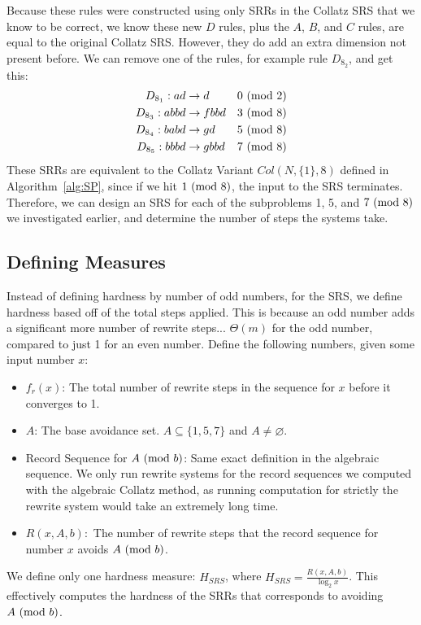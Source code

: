 Because these rules were constructed using only SRRs in the Collatz SRS that we know to be correct, we know these new $D$ rules, plus the $A$, $B$, and $C$ rules, are equal to the original Collatz SRS. However, they do add an extra dimension not present before. We can remove one of the rules, for example rule $D_{8_2}$, and get this:
\begin{align*}
    D_{8_1}: ad &\rightarrow d &\text{$0\ (\mathrm{mod}\ 2)$}\\
    D_{8_3}: abbd &\rightarrow fbbd &\text{$3\ (\mathrm{mod}\ 8)$}\\
    D_{8_4}: babd &\rightarrow gd &\text{$5\ (\mathrm{mod}\ 8)$}\\
    D_{8_5}: bbbd &\rightarrow gbbd &\text{$7\ (\mathrm{mod}\ 8)$}
\end{align*}
These SRRs are equivalent to the Collatz Variant $Col(N,\{1\},8)$ defined in Algorithm~\ref{alg:SP}, since if we hit $1 \ (\mathrm{mod}\ 8)$, the input to the SRS terminates. Therefore, we can design an SRS for each of the subproblems 1, 5, and $7 \ (\mathrm{mod}\ 8)$ we investigated earlier, and determine the number of steps the systems take.

\subsection{Defining Measures} \label{subsec:rewritemeasuredefs}
Instead of defining hardness by number of odd numbers, for the SRS, we define hardness based off of the total steps applied. This is because an odd number adds a significant more number of rewrite steps... $\Theta(m)$ for the odd number, compared to just 1 for an even number. Define the following numbers, given some input number $x$:
\begin{itemize}
    \item $f_r(x)$: The total number of rewrite steps in the sequence for $x$ before it converges to 1.
    \item $A$: The base avoidance set. $A \subseteq \{1, 5, 7\}$ and $A \ne \varnothing$.
    \item Record Sequence for $A \ (\mathrm{mod}\ b)$: Same exact definition in the algebraic sequence. We only run rewrite systems for the record sequences we computed with the algebraic Collatz method, as running computation for strictly the rewrite system would take an extremely long time.
    \item $R(x, A, b):$ The number of rewrite steps that the record sequence for number $x$ avoids $A \ (\mathrm{mod}\ b)$. 
\end{itemize}
We define only one hardness measure: $H_{SRS}$, where $H_{SRS} = \frac{R(x, A, b)}{\log_2{x}}$. This effectively computes the hardness of the SRRs that corresponds to avoiding $A \ (\mathrm{mod}\ b)$.

